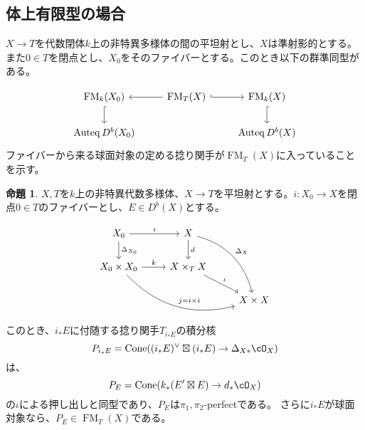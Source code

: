 \documentclass[uplatex, a4paper, dvipdfmx]{jsarticle}
\theoremstyle{definition}
\newtheorem{proposition}[theorem]{命題}
\DeclareMathOperator{\Auteq}{\mathrm{Auteq}}
\DeclareMathOperator{\Cone}{\mathrm{Cone}}
\DeclareMathOperator{\FM}{\mathrm{FM}}
\begin{document}
\subsection{体上有限型の場合}
$X \to T$を代数閉体$k$上の非特異多様体の間の平坦射とし、$X$は準射影的とする。また$0 \in T$を閉点とし、$X_0$をそのファイバーとする。このとき以下の群準同型がある。

\[
    \begin{tikzcd}
        \FM_k(X_0) \ar[d, hookrightarrow]& \FM_T(X) \ar[l] \ar[r, hookrightarrow]& \FM_k(X) \ar[d, hookrightarrow]\\
        \Auteq D^b(X_0)& & \Auteq D^b(X)
    \end{tikzcd}
\]
ファイバーから来る球面対象の定める捻り関手が$\FM_T(X)$に入っていることを示す。
\begin{proposition}
    $X, T$を$k$上の非特異代数多様体、$X \to T$を平坦射とする。$i \colon X_0 \to X$を閉点$0 \in T$のファイバーとし、$E \in D^b(X)$とする。

    \[
        \begin{tikzcd}
            X_0 \arrow[r,"i"]\arrow[d, "\Delta_{X_0}"] & X \arrow[d,"d"]\arrow[rdd, bend left, "\Delta_X"]&\\
            X_0 \times X_0 \arrow[r, "k"]\arrow[rrd, bend right, "j=i \times i"]& X \times_T X\arrow[rd, "\iota"]&\\
            & & X \times X
        \end{tikzcd}
    \]
    このとき、$i_*E$に付随する捻り関手$T_{i_*E}$の積分核
    \begin{equation}
        P_{i_*E} = \Cone((i_*E)^\vee \boxtimes (i_*E) \to \Delta_{X*}\cO_X)
    \end{equation}
    は、
    \begin{equation}
        P_{E} = \Cone(k_*(E' \boxtimes E)\to d_*\cO_X)
    \end{equation}
    の$\iota$による押し出しと同型であり、$P_E$は$\pi_1, \pi_2$-perfectである。
    さらに$i_*E$が球面対象なら、$P_E \in \FM_T(X)$である。
\end{proposition}
\end{document}
